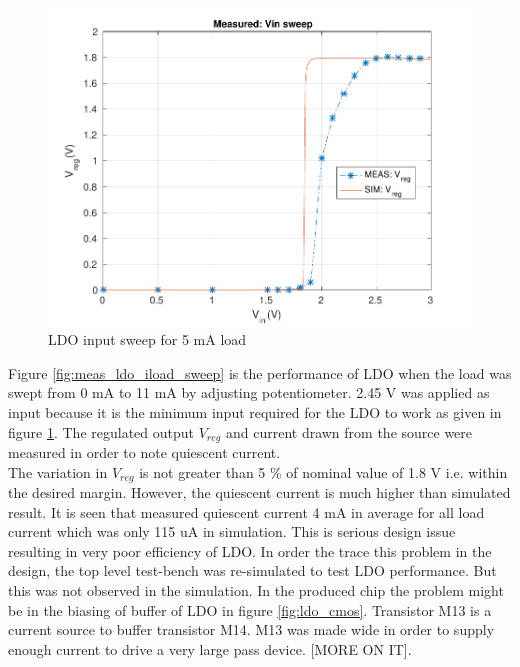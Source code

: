 \documentclass[UKenglish]{ifimaster}  %
\begin{document}
\begin{figure} [!htbp]
  \centering
  \includegraphics[width=\textwidth]{img/meas/ldo_vin_sweep.pdf} 
 \caption{LDO input sweep for 5 mA load} 
\label{fig:meas_ldo_vin_sweep} 
\end{figure}

Figure \ref{fig:meas_ldo_iload_sweep} is the performance of LDO when the load was swept from 0 mA to 11 mA by adjusting 
potentiometer. 2.45 V was applied as input because it is the minimum input required for the LDO to work as given in 
figure \ref{fig:meas_ldo_vin_sweep}. The regulated output $V_{reg}$ and current drawn from the source were measured in 
order to note quiescent current. \\

The variation in $V_{reg}$ is not greater than 5 \% of nominal value of 1.8 V i.e. within the desired margin. However, the quiescent current is much 
higher than simulated result. It is seen that measured quiescent current 4 mA in average for all load current which was 
only 115 uA in simulation. This is serious design issue resulting in very poor efficiency of LDO. In order the trace this
problem in the design, the top level test-bench was re-simulated to test LDO performance. But this was not observed in the 
simulation. In the produced chip the problem might be in the biasing of buffer of LDO in figure \ref{fig:ldo_cmos}. 
Transistor M13 is a current source to buffer transistor M14. M13 was made wide in order to supply enough current to 
drive a very large pass device. [MORE ON IT]. \\
\end{document}

